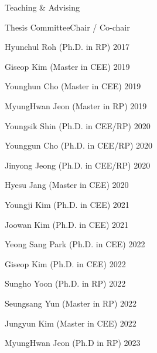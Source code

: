 \begin{rSection}{Teaching \& Advising}
\begin{rSubsection}{Thesis Committee}{}{Chair / Co-chair }{}
  \item Hyunchul Roh (Ph.D. in \ac{RP}) \hfill 2017
  \item Giseop Kim (Master in \ac{CEE}) \hfill 2019
  \item Younghun Cho (Master in \ac{CEE}) \hfill 2019
  \item MyungHwan Jeon (Master in \ac{RP}) \hfill 2019
  \item Youngsik Shin (Ph.D. in \ac{CEE}/\ac{RP}) \hfill 2020
  \item Younggun Cho (Ph.D. in \ac{CEE}/\ac{RP}) \hfill 2020
  \item Jinyong Jeong (Ph.D. in \ac{CEE}/\ac{RP}) \hfill 2020
  \item Hyesu Jang (Master in \ac{CEE}) \hfill 2020
  \item Youngji Kim (Ph.D. in \ac{CEE}) \hfill 2021
  \item Joowan Kim (Ph.D. in \ac{CEE}) \hfill 2021
  \item Yeong Sang Park (Ph.D. in \ac{CEE}) \hfill 2022
  \item Giseop Kim (Ph.D. in \ac{CEE}) \hfill 2022
  \item Sungho Yoon (Ph.D. in \ac{RP}) \hfill 2022
  \item Seungsang Yun (Master in \ac{RP}) \hfill 2022
  \item Jungyun Kim (Master in \ac{CEE}) \hfill 2022
  \item MyungHwan Jeon (Ph.D in \ac{RP}) \hfill 2023
\end{rSubsection}

\end{rSection}
